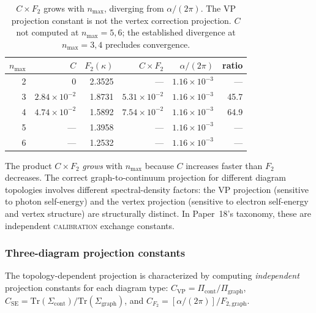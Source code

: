 \documentclass[11pt]{article}
\begin{document}
\begin{table}[h]
\centering
\begin{tabular}{rrrrrr}
\hline
$n_{\max}$ & $C$ & $F_2(\kappa)$ & $C \times F_2$ & $\alpha/(2\pi)$ & ratio \\
\hline
2 & 0 & 2.3525 & --- & $1.16 \times 10^{-3}$ & --- \\
3 & $2.84 \times 10^{-2}$ & 1.8731 & $5.31 \times 10^{-2}$ & $1.16 \times 10^{-3}$ & 45.7 \\
4 & $4.74 \times 10^{-2}$ & 1.5892 & $7.54 \times 10^{-2}$ & $1.16 \times 10^{-3}$ & 64.9 \\
5 & --- & 1.3958 & --- & $1.16 \times 10^{-3}$ & --- \\
6 & --- & 1.2532 & --- & $1.16 \times 10^{-3}$ & --- \\
\hline
\end{tabular}
\caption{$C \times F_2$ grows with $n_{\max}$, diverging from $\alpha/(2\pi)$.
The VP projection constant is not the vertex correction projection.
$C$ not computed at $n_{\max} = 5, 6$; the established divergence
at $n_{\max} = 3, 4$ precludes convergence.}
\label{tab:c_times_f2}
\end{table}

\noindent The product $C \times F_2$ \emph{grows} with $n_{\max}$ because $C$
increases faster than $F_2$ decreases.  The correct graph-to-continuum
projection for different diagram topologies involves different
spectral-density factors: the VP projection (sensitive to photon
self-energy) and the vertex projection (sensitive to electron
self-energy and vertex structure) are structurally distinct.  In
Paper~18's taxonomy, these are independent \textsc{calibration}
exchange constants.

\subsubsection{Three-diagram projection constants}
\label{sec:three_diagram_projection}

The topology-dependent projection is characterized by computing
\emph{independent} projection constants for each diagram type:
$C_{\mathrm{VP}} = \Pi_{\mathrm{cont}} / \Pi_{\mathrm{graph}}$,
$C_{\mathrm{SE}} = \mathrm{Tr}(\Sigma_{\mathrm{cont}}) /
\mathrm{Tr}(\Sigma_{\mathrm{graph}})$, and
$C_{F_2} = [\alpha/(2\pi)] / F_{2,\mathrm{graph}}$.
\end{document}
